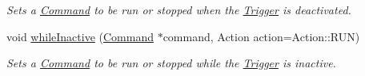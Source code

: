 \begin{DoxyCompactItemize}
\begin{DoxyCompactList}\small\item\em Sets a \mbox{\hyperlink{classlib_iterative_robot_1_1_command}{Command}} to be run or stopped when the \mbox{\hyperlink{classlib_iterative_robot_1_1_trigger}{Trigger}} is deactivated. \end{DoxyCompactList}\item 
void \mbox{\hyperlink{classlib_iterative_robot_1_1_trigger_a7de90fbdaa1d6450f6f1bc532af85686}{while\+Inactive}} (\mbox{\hyperlink{classlib_iterative_robot_1_1_command}{Command}} $\ast$command, Action action=Action\+::\+R\+UN)
\begin{DoxyCompactList}\small\item\em Sets a \mbox{\hyperlink{classlib_iterative_robot_1_1_command}{Command}} to be run or stopped while the \mbox{\hyperlink{classlib_iterative_robot_1_1_trigger}{Trigger}} is inactive. \end{DoxyCompactList}\end{DoxyCompactItemize}
